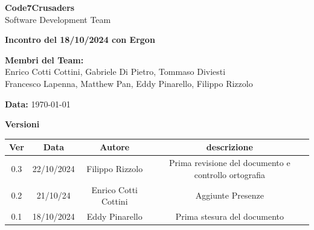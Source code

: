 \documentclass{article}
\begin{document}
\begin{titlepage}
    {\Huge \textbf{Code7Crusaders}}\\
    \vspace{0.5cm}
    {\Large Software Development Team}\\
    \vspace{2cm}
    
    {\large \textbf{Incontro del 18/10/2024 con Ergon}}\\
    \vspace{5cm}

    \textbf{Membri del Team:}\\
    Enrico Cotti Cottini, Gabriele Di Pietro, Tommaso Diviesti \\
    Francesco Lapenna, Matthew Pan, Eddy Pinarello, Filippo Rizzolo \\
    \vspace{0.5cm}
    
    {\large \textbf{Data:}} \today\\
    
    \vspace{1cm}
\end{titlepage}

\tableofcontents
\newpage
\begin{center}
    \textbf{Versioni}
    \\
    \begin{tabular}{|c|c|c|c|}
        \hline
        \textbf{Ver} & \textbf{Data} & \textbf{Autore} & \textbf{descrizione}\\
        \hline
        0.3 & 22/10/2024 & Filippo Rizzolo & Prima revisione del documento e controllo ortografia \\ 
        \hline
	    0.2 & 21/10/24 & Enrico Cotti Cottini & Aggiunte Presenze \\
	    \hline
        0.1 & 18/10/2024 & Eddy Pinarello & Prima stesura del documento \\ 
        \hline
    \end{tabular}
\end{center}
\newpage
\end{document}
